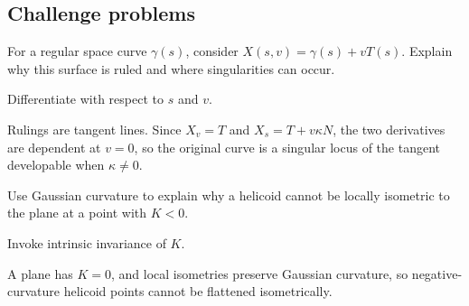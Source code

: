 \subsection*{Challenge problems}

\begin{exercise}\label{exr:vii18-ped-15}
For a regular space curve \(\gamma(s)\), consider \(X(s,v)=\gamma(s)+vT(s)\).  Explain why this surface is ruled and where singularities can occur.
\end{exercise}
\begin{hint}
Differentiate with respect to \(s\) and \(v\).
\end{hint}
\begin{solution}
Rulings are tangent lines.  Since \(X_v=T\) and \(X_s=T+v\kappa N\), the two derivatives are dependent at \(v=0\), so the original curve is a singular locus of the tangent developable when \(\kappa\neq0\).
\end{solution}

\begin{exercise}\label{exr:vii18-ped-16}
Use Gaussian curvature to explain why a helicoid cannot be locally isometric to the plane at a point with \(K<0\).
\end{exercise}
\begin{hint}
Invoke intrinsic invariance of \(K\).
\end{hint}
\begin{solution}
A plane has \(K=0\), and local isometries preserve Gaussian curvature, so negative-curvature helicoid points cannot be flattened isometrically.
\end{solution}

